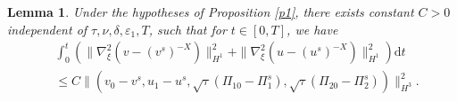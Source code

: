 \documentclass[10pt,reqno]{amsart}
\numberwithin{equation}{section}
\newtheorem{lemma}[theorem]{Lemma}
\newcommand{\dif}{\mathrm{d}}
\begin{document}
 \begin{lemma}\label{lehs3}
Under the hypotheses of Proposition \ref{p1}, there exists constant $C>0$ independent of $\tau, \nu, \delta, \varepsilon_1, T$, such that for $t\in[0, T]$, we have
\begin{equation}\label{hsgj1.3}
\begin{aligned}
&\int_0^t\left(\|\nabla^2_\xi(v-(v^s)^{-X})\|_{H^1}^2
 +\|\nabla^2_\xi(u-(u^s)^{-X})\|_{H^1}^2\right)\dif t\\&\le 	C\|(v_{0}-v^s, u_1-u^s,
\sqrt{\tau}(\Pi_{10}-\Pi_1^s), \sqrt{\tau}(\Pi_{20}-\Pi_2^s))\|_{H^3}^2.
\end{aligned}
\end{equation}
\end{lemma}
\end{document}
